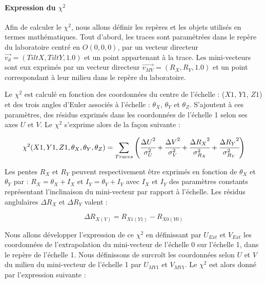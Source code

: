    
   \paragraph{Expression du $\chi^2$}
   
   Afin de calculer le $\chi^2$, nous allons d\'efinir les rep\`eres et les objets utilis\'es en termes math\'ematiques. Tout d'abord, les traces sont param\'etr\'ees dans le rep\`ere du laboratoire centr\'e en $O(0,0,0)$, par un vecteur directeur $\vec{v_d} = (TiltX,TiltY,1.0)$ et un point appartenant \`a la trace. Les mini-vecteurs sont eux exprim\'es par un vecteur directeur $\vec{v_{MV}} = (R_X, R_Y, 1.0)$ et un point correspondant \`a leur milieu dans le rep\`ere du laboratoire.
   
   \medskip
   
   Le $\chi^2$ est calcul\'e en fonction des coordonn\'ees du centre de l'\'echelle : ($X1$, $Y1$, $Z1$) et des trois angles d'Euler associ\'es \`a l'\'echelle : $\theta_X$, $\theta_Y$ et $\theta_Z$. S'ajoutent \`a ces param\`etres, des r\'esidus exprim\'es dans les coordonn\'ees de l'\'echelle 1 selon ses axes $U$ et $V$. Le $\chi^2$ s'exprime alors de la façon suivante : 
   
   \begin{equation}
     \chi^2(X1,Y1,Z1, \theta_X, \theta_Y, \theta_Z) = \sum_{Traces} \left( \cfrac{{\Delta U}^2}{\sigma_U^2} + \cfrac{{\Delta V}^2}{\sigma_V^2} + \cfrac{{\Delta R_X}^2}{\sigma_{R_X}^2} +  \cfrac{{\Delta R_Y}^2}{\sigma_{R_Y}^2} \right)
   \end{equation}

   Les pentes $R_X$ et $R_Y$ peuvent respectivement \^etre exprim\'es en fonction de $ \theta_X$ et $\theta_Y$ par : $R_X = \theta_X + I_X$ et  $I_Y = \theta_Y + I_Y$ avec $I_X$ et $I_Y$ des param\`etres constants repr\'esentant l'inclinaison du mini-vecteur par rapport \`a l'\'echelle. Les r\'esidus anglulaires $\Delta R_X$ et $\Delta R_Y$ valent : 
   
   \begin{equation}
    \Delta R_{X(Y)} = R_{X1(Y1)} - R_{X0(Y0)}  
   \end{equation}
   
   Nous allons d\'evelopper l'expression de ce $\chi^2$ en d\'efinissant par $U_{Ext}$ et $V_{Ext}$ les coordonn\'ees de l'extrapolation du mini-vecteur de l'\'echelle 0 sur l'\'echelle 1, dans le rep\`ere de l'\'echelle 1. Nous d\'efinissons de surcro\^it les coordonn\'ees selon $U$ et $V$ du milieu du mini-vecteur de l'\'echelle 1 par $U_{MV1}$ et $V_{MV1}$. Le $\chi^2$ est alors donn\'e par l'expression suivante :
   
